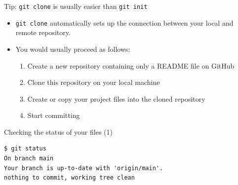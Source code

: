 \documentclass[handout]{beamer}
\begin{document}
\begin{frame}{Tip: \texttt{git clone} is usually easier than \texttt{git init}}
	\begin{itemize}
		\item \texttt{git clone} automatically sets up the connection between your local and remote repository. 
		\item You would usually proceed as follows:
		\begin{enumerate}
			\item Create a new repository containing only a README file on GitHub
			\item Clone this repository on your local machine
			\item Create or copy your project files into the cloned repository
			\item Start committing
		\end{enumerate}
	\end{itemize}
\end{frame}


\begin{frame}[fragile]{Checking the status of your files (1)}

\begin{lstlisting}
$ git status
On branch main
Your branch is up-to-date with 'origin/main'.
nothing to commit, working tree clean
\end{lstlisting}

\end{frame}
\end{document}
